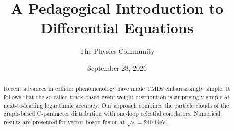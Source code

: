 \documentclass[11pt]{article}
\title{A Pedagogical Introduction to Differential Equations}
\author{The Physics Community}
\date{September 28, 2026}
\begin{document}
\maketitle
\begin{abstract}
Recent advances in collider phenomenology have made TMDs embarrassingly
simple. It follows that the so-called track-based event weight
distribution is surprisingly simple at next-to-leading logarithmic
accuracy. Our approach combines the particle clouds of the graph-based
C-parameter distribution with one-loop celestial correlators. Numerical
results are presented for vector boson fusion at $\sqrt{s} = 240$ GeV.
\end{abstract}
\tableofcontents



\nocite{*}


\end{document}
